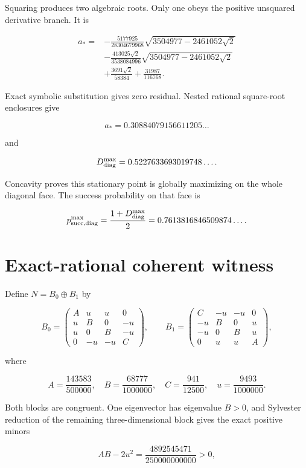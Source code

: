 \documentclass[11pt,a4paper,openany]{report}
\begin{document}
Squaring produces two algebraic roots. Only one obeys the positive unsquared derivative branch. It is

\[
\begin{aligned}
a_*={}&-
\frac{5177925}{28304679968}
\sqrt{3504977-2461052\sqrt2}\\
&-
\frac{413025\sqrt2}{3538084996}
\sqrt{3504977-2461052\sqrt2}\\
&+\frac{3691\sqrt2}{58384}
+\frac{31987}{116768}.
\end{aligned}
\]

Exact symbolic substitution gives zero residual. Nested rational square-root enclosures give

\[
a_*=0.30884079156611205\ldots
\]

and

\[
D_{\rm diag}^{\max}=0.5227633693019748\ldots .
\]

Concavity proves this stationary point is globally maximizing on the whole diagonal face. The success probability on that face is

\[
p_{\rm succ,diag}^{\max}
=\frac{1+D_{\rm diag}^{\max}}2
=0.7613816846509874\ldots .
\]

\section{Exact-rational coherent witness}

Define \(N=B_0\oplus B_1\) by

\[
B_0=\begin{pmatrix}
A&u&u&0\\
u&B&0&-u\\
u&0&B&-u\\
0&-u&-u&C
\end{pmatrix},
\qquad
B_1=\begin{pmatrix}
C&-u&-u&0\\
-u&B&0&u\\
-u&0&B&u\\
0&u&u&A
\end{pmatrix},
\]

where

\[
A=\frac{143583}{500000},\quad
B=\frac{68777}{1000000},\quad
C=\frac{941}{12500},\quad
u=\frac{9493}{1000000}.
\]

Both blocks are congruent. One eigenvector has eigenvalue \(B>0\), and Sylvester reduction of the remaining three-dimensional block gives the exact positive minors

\[
AB-2u^2=
\frac{4892545471}{250000000000}>0,
\]
\end{document}
